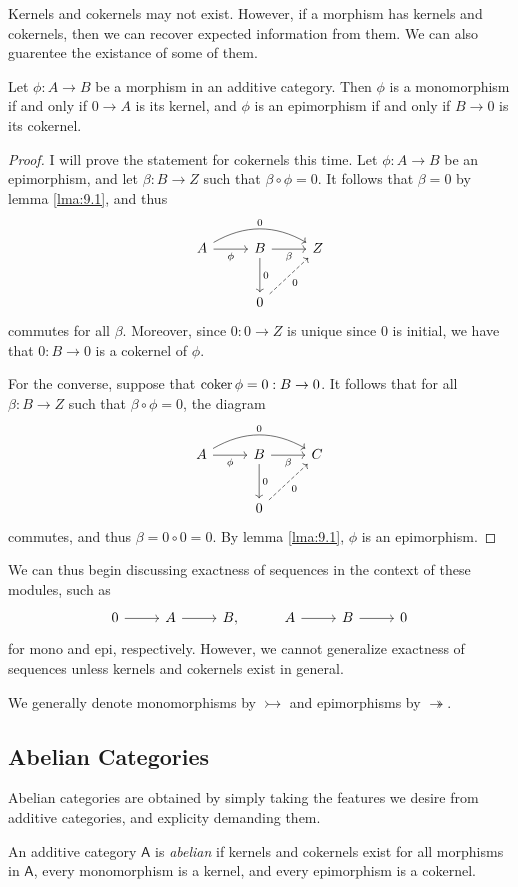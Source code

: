 Kernels and cokernels may not exist. However, if a morphism has kernels and cokernels, then we can recover expected information from them. We can also guarentee the existance of some of them.

\begin{lemma}\label{lma:9.3}
	Let $\phi : A \to B$ be a morphism in an additive category. Then $\phi $ is a monomorphism if and only if $0\to A$ is its kernel, and $\phi$ is an epimorphism if and only if $B\to 0$ is its cokernel.
\end{lemma}
\begin{proof}
	I will prove the statement for cokernels this time. Let $\phi : A \to B$ be an epimorphism, and let $\beta : B \to Z$ such that $\beta \circ \phi =0$. It follows that $\beta =0$ by lemma \ref{lma:9.1}, and thus
	\[\begin{tikzcd}[row sep = 2.5em, column sep = 2.5em]
		A\arrow[rr, bend left, "0"]\arrow[r, "\phi "']&B\arrow[r, "\beta "']\arrow[d, "0"]&Z\\
				   &0\arrow[ur, dashed, "0"']
	\end{tikzcd}\]
	commutes for all $\beta $. Moreover, since $0: 0 \to Z$ is unique since $0$ is initial, we have that $0: B \to 0$ is a cokernel of $\phi $.

	For the converse, suppose that $\operatorname{coker} \phi =0: B \to 0$. It follows that for all $\beta : B \to Z$ such that $\beta \circ \phi =0$, the diagram
	\[\begin{tikzcd}[row sep = 2.5em, column sep = 2.5em]
		A\arrow[r, "\phi "']\arrow[rr, bend left,  "0"]&B\arrow[d, "0"]\arrow[r, "\beta "']&C\\
							       &0\arrow[ur, dashed, "0"']
	\end{tikzcd}\]
	commutes, and thus $\beta =0\circ 0=0$. By lemma \ref{lma:9.1}, $\phi $ is an epimorphism.
\end{proof}

We can thus begin discussing exactness of sequences in the context of these modules, such as
\[\begin{tikzcd}[row sep = 2.5em, column sep = 2.5em]
	0\arrow[r]&A\arrow[r]&B,&A\arrow[r]&B\arrow[r]&0
\end{tikzcd}\]
for mono and epi, respectively. However, we cannot generalize exactness of sequences unless kernels and cokernels exist in general.

We generally denote monomorphisms by $\rightarrowtail$ and epimorphisms by $\twoheadrightarrow$.

\subsection{Abelian Categories}
Abelian categories are obtained by simply taking the features we desire from additive categories, and explicity demanding them.
\begin{definition}\label{dfn:9.4}
	An additive category $\mathsf{A} $ is \emph{abelian} if kernels and cokernels exist for all morphisms in $\mathsf{A} $, every monomorphism is a kernel, and every epimorphism is a cokernel.
\end{definition}

